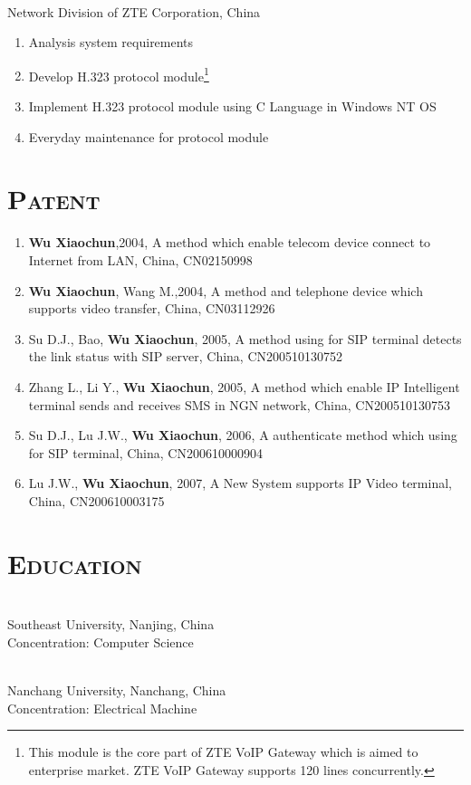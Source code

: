 \documentclass[margin,11pt]{res}
\begin{document}
\begin{resume}
     \\
    Network Division of ZTE Corporation, China
     \begin{enumerate}\itemsep -2pt %
     \item Analysis system requirements
     \item Develop H.323 protocol module\footnote{This module
           is the core part of ZTE VoIP Gateway which is aimed to enterprise market. ZTE
           VoIP Gateway supports 120 lines concurrently.}
     \item Implement H.323 protocol module using C Language in Windows NT OS
     \item Everyday maintenance for protocol module
     \end{enumerate} 

\section{{\textsc{Patent}}}

\begin{enumerate}
\item \textbf{Wu Xiaochun},2004, A method which enable telecom device connect to Internet from LAN,
  China, CN02150998
\item \textbf{Wu Xiaochun}, Wang M.,2004, A method and telephone device which supports video
  transfer, China, CN03112926
\item Su D.J., Bao, \textbf{Wu Xiaochun}, 2005, A method using for SIP terminal detects the link
  status with SIP server, China, CN200510130752
\item Zhang L., Li Y., \textbf{Wu Xiaochun}, 2005, A method which enable IP Intelligent terminal
  sends and receives SMS in NGN network, China, CN200510130753
\item Su D.J., Lu J.W., \textbf{Wu Xiaochun}, 2006, A authenticate method which using for SIP
  terminal, China, CN200610000904
\item Lu J.W., \textbf{Wu Xiaochun}, 2007, A New System supports IP Video terminal, China,
  CN200610003175
\end{enumerate}

\section{\textsc{Education}} 
  \\
Southeast University, Nanjing, China \\
Concentration: Computer Science

 \\
Nanchang University, Nanchang, China \\
Concentration: Electrical Machine
 
\end{resume}
\end{document}
